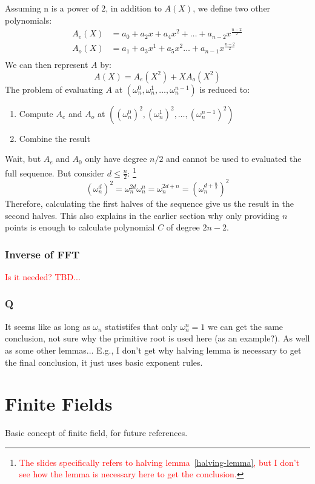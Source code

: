 \documentclass[10pt]{article}
\newcommand{\HL}[1]{\textcolor{red}{#1}}
\begin{document}
Assuming n is a power of $2$, in addition to $A(X)$, we define two other
polynomials:
\[
\begin{aligned}
    A_e(X) &= a_0 + a_2x + a_4x^2 + \ldots + a_{n-2}x^{\frac{n-2}{2}} \\
    A_o(X) &= a_1 + a_3x^1 + a_5x^{2} \ldots + a_{n-1}x^{\frac{n-2}{2}} \\
\end{aligned}
\]
We can then represent $A$ by:
\[
    A(X) = A_e(X^2) + XA_o(X^2)
\]
The problem of evaluating $A$ at $(\omega^0_n, \omega^1_n, \ldots, \omega^{n-1}_n)$
is reduced to:
\begin{enumerate}
    \item Compute $A_e$ and $A_o$ at $((\omega^0_n)^2, (\omega^1_n)^2, \ldots,
        (\omega^{n-1}_n)^2)$
    \item Combine the result
\end{enumerate}
Wait, but $A_e$ and $A_0$ only have degree $n/2$ and cannot be used to
evaluated the full sequence. But consider $d \leq \frac{n}{2}$:
\footnote{\HL{The slides specifically refers to halving
lemma~\ref{halving-lemma}, but I don't see how the lemma is necessary here to
get the conclusion.}}
\[
    (\omega^{d}_n)^2 = \omega^{2d}_{n}\omega^{n}_{n} = \omega^{2d+n}_{n} =
    (\omega^{d + \frac{n}{2}}_n)^2
\]
Therefore, calculating the first halves of the sequence give us the result in the second
halves. This also explains in the earlier section why only providing $n$ points
is enough to calculate polynomial $C$ of degree $2n-2$.

\subsubsection{Inverse of FFT}
\HL{Is it needed? TBD...}

\subsubsection{Q}
It seems like as long as $\omega_n$ statistifes that only $\omega^n_n = 1$ we
can get the same conclusion, not sure why the primitive root is used here (as
an example?). As well as some other lemmas... E.g., I don't get why halving
lemma is necessary to get the final conclusion, it just uses basic exponent
rules.

\section{Finite Fields}
Basic concept of finite field, for future references.
\end{document}
